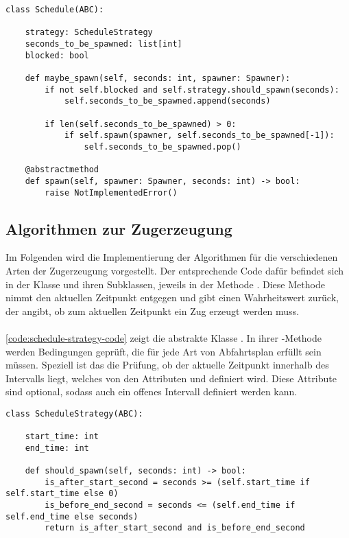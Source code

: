 \lstset{language=python}
\begin{lstlisting}[caption={Ausschnitt aus der abstrakten Klasse \code{Schedule}, welcher die \emph{Template-Method} \code{maybe\_spawn} und weitere relevante Attribute zeigt. \code{maybe\_spawn} prüft, ob zum Zeitpunkt \code{seconds} ein Zug erzeugt werden soll und erzeugt ihn dann ggf.}, label=code:template-method-code]
class Schedule(ABC):

    strategy: ScheduleStrategy
    seconds_to_be_spawned: list[int]
    blocked: bool

    def maybe_spawn(self, seconds: int, spawner: Spawner):
        if not self.blocked and self.strategy.should_spawn(seconds):
            self.seconds_to_be_spawned.append(seconds)

        if len(self.seconds_to_be_spawned) > 0:
            if self.spawn(spawner, self.seconds_to_be_spawned[-1]):
                self.seconds_to_be_spawned.pop()

    @abstractmethod
    def spawn(self, spawner: Spawner, seconds: int) -> bool:
    	raise NotImplementedError()
\end{lstlisting}

\subsection{Algorithmen zur Zugerzeugung}

Im Folgenden wird die Implementierung der Algorithmen für die verschiedenen Arten der Zugerzeugung vorgestellt. Der entsprechende Code dafür befindet sich in der Klasse  und ihren Subklassen, jeweils in der Methode . Diese Methode nimmt den aktuellen Zeitpunkt  entgegen und gibt einen Wahrheitswert zurück, der angibt, ob zum aktuellen Zeitpunkt ein Zug erzeugt werden muss.\\
\\
\autoref{code:schedule-strategy-code} zeigt die abstrakte Klasse . In ihrer -Methode werden Bedingungen geprüft, die für jede Art von Abfahrtsplan erfüllt sein müssen. Speziell ist das die Prüfung, ob der aktuelle Zeitpunkt innerhalb des Intervalls liegt, welches von den Attributen  und  definiert wird. Diese Attribute sind optional, sodass auch ein offenes Intervall definiert werden kann.

\lstset{language=python}
\begin{lstlisting}[caption={Ausschnitt aus der abstrakten Klasse \code{ScheduleStrategy}. Gezeigt wird die Methode \code{should\_spawn}, sowie die relevanten Attribute \code{start\_time} und \code{end\_time}.}, label=code:schedule-strategy-code]
class ScheduleStrategy(ABC):

    start_time: int
    end_time: int

    def should_spawn(self, seconds: int) -> bool:
        is_after_start_second = seconds >= (self.start_time if self.start_time else 0)
        is_before_end_second = seconds <= (self.end_time if self.end_time else seconds)
        return is_after_start_second and is_before_end_second
\end{lstlisting}

